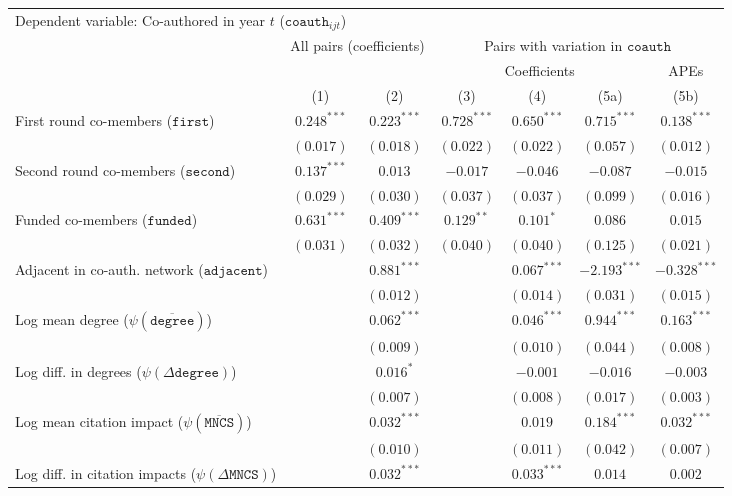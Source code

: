 \begin{tabular}{l c c c c c c}
\toprule
\multicolumn{7}{l}{Dependent variable: Co-authored in year $t$ ($\mathtt{coauth}_{ijt}$)} \\
& \multicolumn{2}{c}{All pairs (coefficients)} & \multicolumn{4}{c}{Pairs with variation in $\mathtt{coauth}$} \\
\cmidrule(lr){2-3} \cmidrule(lr){4-7}
& & & \multicolumn{3}{c}{Coefficients} & APEs \\
\cmidrule(lr){4-6}
& (1) & (2) & (3) & (4) & (5a) & (5b) \\
\midrule
First round co-members ($\mathtt{first}$) & $0.248^{***}$ & $0.223^{***}$ & $0.728^{***}$ & $0.650^{***}$ & $0.715^{***}$ & $0.138^{***}$ \\
& $(0.017)$ & $(0.018)$ & $(0.022)$ & $(0.022)$ & $(0.057)$ & $(0.012)$ \\
Second round co-members ($\mathtt{second}$) & $0.137^{***}$ & $0.013$ & $-0.017$ & $-0.046$ & $-0.087$ & $-0.015$ \\
& $(0.029)$ & $(0.030)$ & $(0.037)$ & $(0.037)$ & $(0.099)$ & $(0.016)$ \\
Funded co-members ($\mathtt{funded}$) & $0.631^{***}$ & $0.409^{***}$ & $0.129^{**}$ & $0.101^{*}$ & $0.086$ & $0.015$ \\
& $(0.031)$ & $(0.032)$ & $(0.040)$ & $(0.040)$ & $(0.125)$ & $(0.021)$ \\
Adjacent in co-auth. network ($\mathtt{adjacent}$) & & $0.881^{***}$ & & $0.067^{***}$ & $-2.193^{***}$ & $-0.328^{***}$ \\
& & $(0.012)$ & & $(0.014)$ & $(0.031)$ & $(0.015)$ \\
Log mean degree ($\psi(\overline{\mathtt{degree}})$) & & $0.062^{***}$ & & $0.046^{***}$ & $0.944^{***}$ & $0.163^{***}$ \\
& & $(0.009)$ & & $(0.010)$ & $(0.044)$ & $(0.008)$ \\
Log diff. in degrees ($\psi(\Delta \mathtt{degree})$) & & $0.016^{*}$ & & $-0.001$ & $-0.016$ & $-0.003$ \\
& & $(0.007)$ & & $(0.008)$ & $(0.017)$ & $(0.003)$ \\
Log mean citation impact ($\psi(\overline{\mathtt{MNCS}})$) & & $0.032^{***}$ & & $0.019$ & $0.184^{***}$ & $0.032^{***}$ \\
& & $(0.010)$ & & $(0.011)$ & $(0.042)$ & $(0.007)$ \\
Log diff. in citation impacts ($\psi(\Delta\mathtt{MNCS})$) & & $0.032^{***}$ & & $0.033^{***}$ & $0.014$ & $0.002$ \\

\end{tabular}
